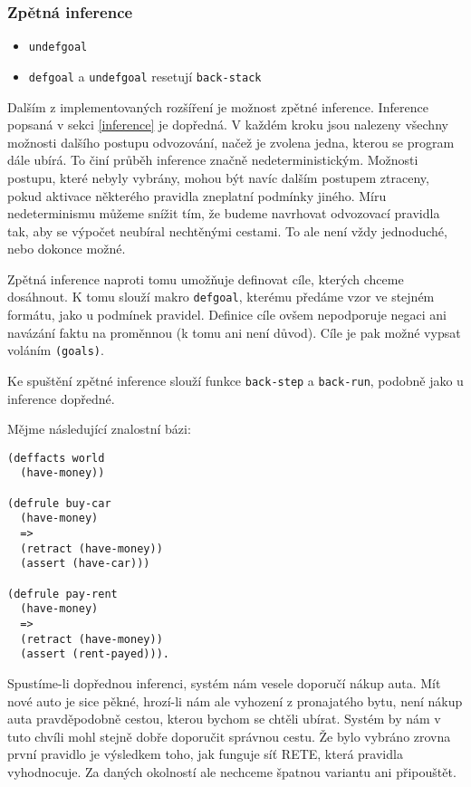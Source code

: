 \subsubsection{Zpětná inference}

\begin{framed}
  \begin{itemize}
    \item \verb|undefgoal|
    \item \verb|defgoal| a \verb|undefgoal| resetují \verb|back-stack|
  \end{itemize}
\end{framed}

Dalším z implementovaných rozšíření je možnost zpětné inference. Inference
popsaná v sekci \ref{inference} je dopředná. V každém kroku jsou nalezeny
všechny možnosti dalšího postupu odvozování, načež je zvolena jedna, kterou se
program dále ubírá. To činí průběh inference značně nedeterministickým. Možnosti
postupu, které nebyly vybrány, mohou být navíc dalším postupem ztraceny, pokud
aktivace některého pravidla zneplatní podmínky jiného.
Míru nedeterminismu můžeme snížit tím, že budeme navrhovat odvozovací pravidla
tak, aby se výpočet neubíral nechtěnými cestami. To ale není vždy jednoduché,
nebo dokonce možné.

Zpětná inference naproti tomu umožňuje definovat cíle, kterých chceme dosáhnout.
K tomu slouží makro \verb|defgoal|, kterému předáme vzor ve stejném formátu,
jako u podmínek pravidel. Definice cíle ovšem nepodporuje negaci ani navázání
faktu na proměnnou (k tomu ani není důvod). Cíle je pak možné vypsat voláním
\verb|(goals)|.

Ke spuštění zpětné inference slouží funkce \verb|back-step| a
\verb|back-run|, podobně jako u inference dopředné.

Mějme následující znalostní bázi:
\begin{verbatim}
(deffacts world
  (have-money))

(defrule buy-car
  (have-money)
  =>
  (retract (have-money))
  (assert (have-car)))

(defrule pay-rent
  (have-money)
  =>
  (retract (have-money))
  (assert (rent-payed))).
\end{verbatim}
Spustíme-li dopřednou inferenci, systém nám vesele doporučí nákup auta.
Mít nové auto je sice pěkné, hrozí-li nám ale vyhození z pronajatého bytu,
není nákup auta pravděpodobně cestou, kterou bychom se chtěli ubírat.
Systém by nám v tuto chvíli mohl stejně dobře doporučit správnou cestu. Že bylo
vybráno zrovna první pravidlo je výsledkem toho, jak funguje síť RETE, která
pravidla vyhodnocuje. Za daných okolností ale nechceme špatnou variantu ani
připouštět.

